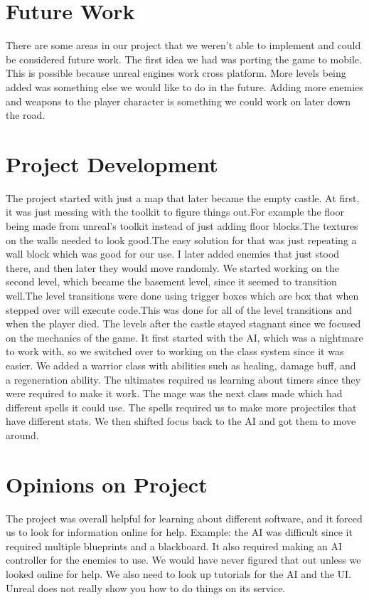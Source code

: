 \documentclass{sigchi}
\begin{document}
\section{Future Work}
There are some areas in our project that we weren't able to implement and could be considered future work. The first idea we had was porting the game to mobile. This is possible because unreal engines work cross platform. More levels being added was something else we would like to do in the future. Adding more enemies and weapons to the player character is something we could work on later down the road. 


\section{Project Development}
The project started with just a map that later became the empty castle. At first, it was just messing with the toolkit to figure things out.For example the floor being made from unreal's toolkit instead of just adding floor blocks.The textures on the walls needed to look good.The easy solution for that was just repeating a wall block which was good for our use.  I later added enemies that just stood there, and then later they would move randomly. We started working on the second level, which became the basement level, since it seemed to transition well.The level transitions were done using trigger boxes which are box that when stepped over will execute code.This was done for all of the level transitions and when the player died. The levels after the castle stayed stagnant since we focused on the mechanics of the game. It first started with the AI, which was a nightmare to work with, so we switched over to working on the class system since it was easier. We added a warrior class with abilities such as healing, damage buff, and a regeneration ability. The ultimates required us learning about timers since they were required to make it work. The mage was the next class made which had different spells it could use. The spells required us to make more projectiles that have different stats. We then shifted focus back to the AI and got them to move around. 


\section{Opinions on Project}
The project was overall helpful for learning about different software, and it forced us to look for information online for help. Example: the AI was difficult since it required multiple blueprints and a blackboard. It also required making an AI controller for the enemies to use. We would have never figured that out unless we looked online for help. We also need to look up tutorials for the AI and the UI. Unreal does not really show you how to do things on its service.
\end{document}
